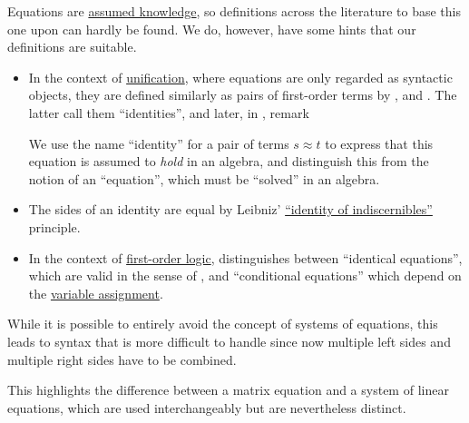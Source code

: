 \begin{comments}
  \item Equations are \hyperref[con:assumed_knowledge]{assumed knowledge}, so definitions across the literature to base this one upon can hardly be found. We do, however, have some hints that our definitions are suitable.

  \begin{itemize}
    \item In the context of \hyperref[con:unification]{unification}, where equations are only regarded as syntactic objects, they are defined similarly as pairs of first-order terms by ,  and . The latter call them \enquote{identities}, and later, in , remark
    \begin{displayquote}
      We use the name \enquote{identity} for a pair of terms \( s \approx t \) to express that this equation is assumed to \textit{hold} in an algebra, and distinguish this from the notion of an \enquote{equation}, which must be \enquote{solved} in an algebra.
    \end{displayquote}

    \item The sides of an identity are equal by Leibniz' \hyperref[rem:identity_of_indiscernibles]{\enquote{identity of indiscernibles}} principle.

    \item In the context of \hyperref[def:nth_order_logic]{first-order logic},  distinguishes between \enquote{identical equations}, which are valid in the sense of , and \enquote{conditional equations} which depend on the \hyperref[def:first_order_valuation/variable_assignment]{variable assignment}.
  \end{itemize}

  \item While it is possible to entirely avoid the concept of systems of equations, this leads to syntax that is more difficult to handle since now multiple left sides and multiple right sides have to be combined.

  This highlights the difference between a matrix equation and a system of linear equations, which are used interchangeably but are nevertheless distinct.
\end{comments}

